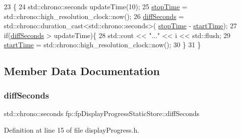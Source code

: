 \begin{DoxyCode}
23                                     \{
24             std::chrono::seconds updateTime(10);
25                 \hyperlink{classfp_1_1fpDisplayProgressStaticStore_a7af621498c605e7955b9f1bb2abdb5a4}{stopTime} = std::chrono::high\_resolution\_clock::now();
26                 \hyperlink{classfp_1_1fpDisplayProgressStaticStore_a9765e1784e83522a0b842d342e479816}{diffSeconds} =    std::chrono::duration\_cast<std::chrono::seconds>(
      \hyperlink{classfp_1_1fpDisplayProgressStaticStore_a7af621498c605e7955b9f1bb2abdb5a4}{stopTime} - \hyperlink{classfp_1_1fpDisplayProgressStaticStore_aa602428554cc8543ec40617ffacd531d}{startTime});
27                 \textcolor{keywordflow}{if}(\hyperlink{classfp_1_1fpDisplayProgressStaticStore_a9765e1784e83522a0b842d342e479816}{diffSeconds} > updateTime)\{
28                     std::cout << \textcolor{stringliteral}{"..."} << i << std::flush;
29                     \hyperlink{classfp_1_1fpDisplayProgressStaticStore_aa602428554cc8543ec40617ffacd531d}{startTime} = std::chrono::high\_resolution\_clock::now();
30                 \}
31             \}
\end{DoxyCode}


\subsection{Member Data Documentation}
\mbox{\label{classfp_1_1fpDisplayProgressStaticStore_a9765e1784e83522a0b842d342e479816}} 
\subsubsection{\texorpdfstring{diff\+Seconds}{diffSeconds}}
{\footnotesize\ttfamily std\+::chrono\+::seconds fp\+::fp\+Display\+Progress\+Static\+Store\+::diff\+Seconds\hspace{0.3cm}{\ttfamily [private]}}



Definition at line 15 of file display\+Progress.\+h.

\mbox{\label{classfp_1_1fpDisplayProgressStaticStore_aa602428554cc8543ec40617ffacd531d}} 
